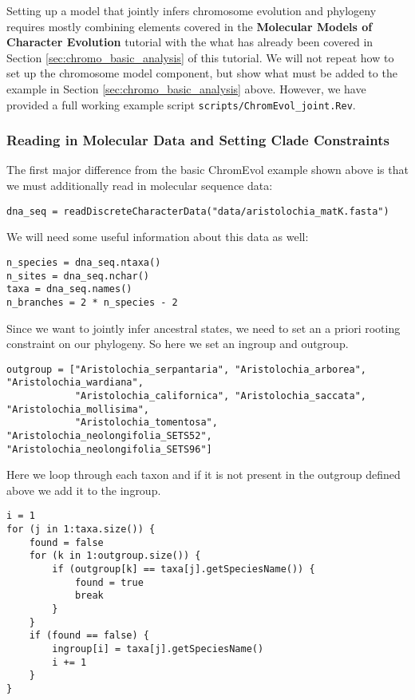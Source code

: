 Setting up a model that jointly infers chromosome evolution and phylogeny requires mostly combining
elements covered in the \textbf{Molecular Models of Character Evolution} tutorial with the
what has already been covered in Section \ref{sec:chromo_basic_analysis} of this tutorial. We will not repeat how to set up the chromosome model
component, but show what must be added to the example in Section \ref{sec:chromo_basic_analysis} above.
However, we have provided a full working example script \texttt{scripts/ChromEvol\_joint.Rev}.

\subsubsection{Reading in Molecular Data and Setting Clade Constraints}

The first major difference from the basic ChromEvol example shown above is that we must additionally
read in molecular sequence data:
{\tt \begin{snugshade*}
\begin{lstlisting}
dna_seq = readDiscreteCharacterData("data/aristolochia_matK.fasta")
\end{lstlisting}
\end{snugshade*}}
We will need some useful information about this data as well:
{\tt \begin{snugshade*}
\begin{lstlisting}
n_species = dna_seq.ntaxa()
n_sites = dna_seq.nchar()
taxa = dna_seq.names()
n_branches = 2 * n_species - 2
\end{lstlisting}
\end{snugshade*}}
Since we want to jointly infer ancestral states, we need to set an a priori
rooting constraint on our phylogeny. So here we set an ingroup and outgroup.
{\tt \begin{snugshade*}
\begin{lstlisting}
outgroup = ["Aristolochia_serpantaria", "Aristolochia_arborea", "Aristolochia_wardiana",
            "Aristolochia_californica", "Aristolochia_saccata", "Aristolochia_mollisima",
            "Aristolochia_tomentosa", "Aristolochia_neolongifolia_SETS52", "Aristolochia_neolongifolia_SETS96"]
\end{lstlisting}
\end{snugshade*}}
Here we loop through each taxon and if it is not present in the outgroup
defined above we add it to the ingroup.
{\tt \begin{snugshade*}
\begin{lstlisting}
i = 1
for (j in 1:taxa.size()) {
    found = false
    for (k in 1:outgroup.size()) {
        if (outgroup[k] == taxa[j].getSpeciesName()) {
            found = true
            break
        }
    }
    if (found == false) {
        ingroup[i] = taxa[j].getSpeciesName()
        i += 1
    }
}
\end{lstlisting}
\end{snugshade*}}
